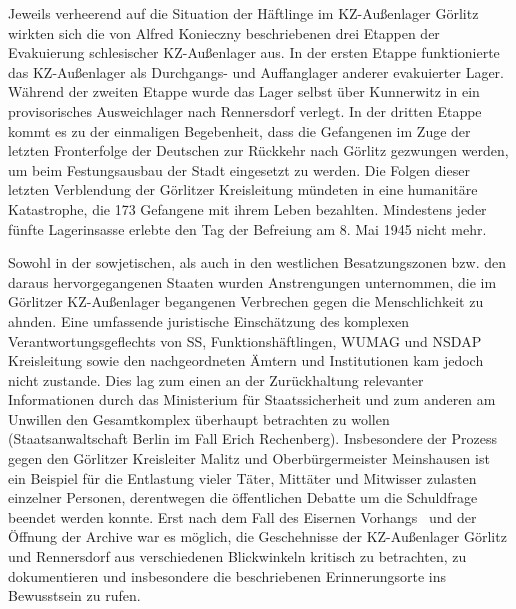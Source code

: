 \documentclass[a4paper,12pt,ngerman,
]{nisebook}
\begin{document}
Jeweils verheerend auf die Situation der Häftlinge im KZ-Außenlager Görlitz wirkten sich die von Alfred Konieczny beschriebenen drei Etappen der Evakuierung schlesischer KZ-Außenlager aus. In der ersten Etappe funktionierte das KZ-Außenlager als Durchgangs- und Auffanglager anderer evakuierter Lager. Während der zweiten Etappe wurde das Lager selbst über Kunnerwitz in ein provisorisches Ausweichlager nach Rennersdorf verlegt.
In der dritten Etappe kommt es zu der einmaligen Begebenheit, dass die Gefangenen im Zuge der letzten Fronterfolge der Deutschen zur Rückkehr nach Görlitz gezwungen werden, um beim Festungsausbau der Stadt eingesetzt zu werden. Die Folgen dieser letzten Verblendung der Görlitzer Kreisleitung mündeten in eine humanitäre Katastrophe, die 173 Gefangene mit ihrem Leben bezahlten. Mindestens jeder fünfte Lagerinsasse erlebte den Tag der Befreiung am 8. Mai 1945 nicht mehr.

Sowohl in der sowjetischen, als auch in den westlichen Besatzungszonen bzw. den daraus hervorgegangenen Staaten wurden Anstrengungen unternommen, die im Görlitzer KZ-Außenlager begangenen Verbrechen gegen die Menschlichkeit zu ahnden. Eine umfassende juristische Einschätzung des komplexen Verantwortungsgeflechts von SS, Funktionshäftlingen, WUMAG und \mbox{NSDAP} Kreisleitung sowie den nachgeordneten Ämtern und Institutionen kam jedoch nicht zustande. Dies lag zum einen an der Zurückhaltung relevanter Informationen durch das Ministerium für Staatssicherheit und zum anderen am Unwillen den Gesamtkomplex überhaupt betrachten zu wollen (Staatsanwaltschaft Berlin im Fall Erich Rechenberg). Insbesondere der Prozess gegen den Görlitzer Kreisleiter Malitz und Oberbürgermeister Meinshausen ist ein Beispiel für die Entlastung vieler Täter, Mittäter und Mitwisser zulasten einzelner Personen, derentwegen die öffentlichen Debatte um die Schuldfrage beendet werden konnte. Erst nach dem Fall des \glqq Eisernen Vorhangs\grqq~ und der Öffnung der Archive war es möglich, die Geschehnisse der KZ-Außenlager Görlitz und Rennersdorf aus verschiedenen Blickwinkeln kritisch zu betrachten, zu dokumentieren und insbesondere die beschriebenen Erinnerungsorte ins Bewusstsein zu rufen. 
\end{document}
